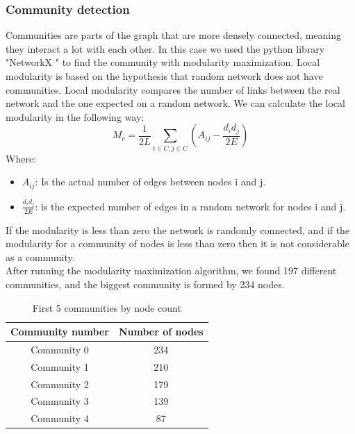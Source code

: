 \documentclass[12pt,journal,compsoc]{IEEEtran}
\begin{document}
\subsubsection{Community detection}
Communities are parts of the graph that are more densely connected, meaning they interact a lot with each other. In this case we used the python library "NetworkX \cite{NetworkX}" to find the community with modularity maximization. Local modularity is based on the hypothesis that random network does not have communities. Local modularity \cite{Modularity} compares the number of links between the real network and the one expected on a random network. We can calculate the local modularity in the following way:
\[M_c = \frac{1}{2L}\sum_{i \in C, j\in C }(A_{ij} - \frac{d_id_j}{2E})\] 
Where:
\begin{itemize}[]
    \item $A_{ij}$: Is the actual number of edges between nodes i and j.
    \item $\frac{d_id_j}{2E}$: is the expected number of edges in a random network for nodes i and j.
\end{itemize}

If the modularity is less than zero the network is randomly connected, and if the modularity for a community of nodes is less than zero then it is not considerable as a community.\\
After running the modularity maximization algorithm, we found 197 different communities, and the biggest community is formed by 234 nodes.

\begin{table}[ht]
	\centering
	\begin{tabular}{c c }
		Community number & Number of nodes  \\
		\hline
		Community 0& 234  \\
		Community 1& 210  \\
		Community 2& 179  \\
		Community 3& 139  \\
		Community 4& 87  \\
	\end{tabular}
	\caption{First 5 communities by node count}
	\end{table}
	
\end{document}
